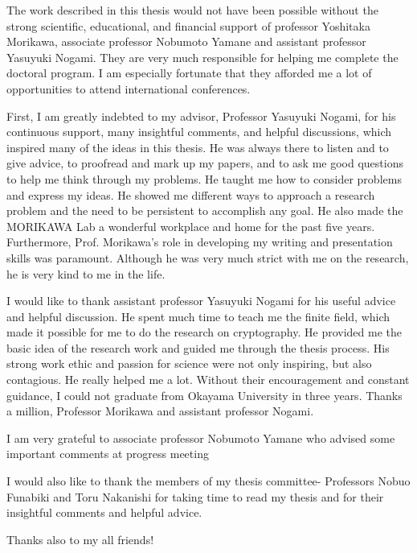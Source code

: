 The work described in this thesis would not have been possible without the strong scientific, educational, and financial support of professor Yoshitaka Morikawa, associate professor Nobumoto Yamane and assistant professor Yasuyuki Nogami. They are very much responsible for helping me complete the doctoral program. I am especially fortunate that they afforded me a lot of opportunities to attend international conferences. 

\vspace{5pt}
First, I am greatly indebted to my advisor, Professor Yasuyuki Nogami, for his continuous support,  many insightful comments, and helpful discussions, which inspired many of the ideas in this thesis.  He was always there to listen and to give advice, to proofread and mark up my papers, and to ask me good questions to help me think through my problems. He taught me how to consider problems and express my ideas. He showed me different ways to approach a research problem and the need to be persistent to accomplish any goal.  He also made the MORIKAWA Lab a wonderful workplace and home for the past five years. Furthermore, Prof. Morikawa's role in developing my writing and presentation skills was paramount.  Although he was very much strict with me on the research, he is very kind to me in the life. 

\vspace{5pt}
I would like to thank assistant professor Yasuyuki Nogami for his useful advice and helpful discussion. He spent much time to teach me the finite field, which made it possible for me to do the research on cryptography. He provided me the basic idea of the research work and guided me through the thesis process. His strong work ethic and passion for science were not only inspiring, but also contagious. He really helped me a lot. Without their encouragement and constant guidance, I could not graduate from Okayama University in three years. Thanks a million, Professor Morikawa and assistant professor Nogami.

\vspace{5pt}
I am very grateful to associate professor Nobumoto Yamane who advised some important comments at progress meeting

\vspace{5pt}
I would also like to thank the members of my thesis committee- Professors Nobuo Funabiki and Toru Nakanishi for taking time to read my thesis and for their insightful comments and helpful advice.


\vspace{5pt}
Thanks also to my all friends!